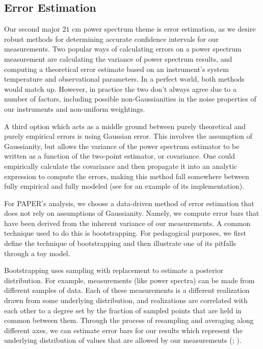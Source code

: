 \documentclass[preprint2,numberedappendix,tighten]{aastex6}  %
\begin{document}

\subsection{Error Estimation}
\label{sec:ErrorOverview}

Our second major $21$ cm power spectrum theme is error estimation, as we desire robust methods for determining accurate 
confidence intervals for our measurements. Two popular ways of calculating errors on a power spectrum 
measurement are calculating the variance of power spectrum results, and computing a theoretical error estimate based on an instrument's 
system temperature and observational parameters. In a perfect world, both methods would match up. However, in practice the 
two don't always agree due to a number of factors, including possible non-Gaussianities in the noise properties of our instruments and non-uniform 
weightings. 

A third option which acts as a middle ground between purely theoretical and purely empirical errors is using Gaussian error. This involves the assumption of Gaussianity, but allows the variance of the power spectrum estimator to be written as a function of the two-point estimator, or covariance. One could empirically calculate the covariance and then propagate it into an analytic expression to compute the errors, making this method fall somewhere between fully empirical and fully modeled (see \citet{das_et_al2011a} for an example of its implementation). 

For PAPER's analysis, we choose a data-driven method of error estimation that does not rely on assumptions of Gaussianity. Namely, we compute error bars that have been derived from the inherent 
variance of our measurements. A common technique used to do this is bootstrapping. For pedagogical purposes, we first define the technique of 
bootstrapping and then illustrate one of its pitfalls through a toy model.

Bootstrapping uses sampling with replacement to estimate a posterior distribution. For example, measurements (like power 
spectra) can be made from different samples of data. Each of these measurements is a different realization drawn from some underlying distribution, and realizations are correlated with each other to a degree set by the fraction of sampled points that are held in common 
between them. Through the process of resampling and averaging along different axes, we can estimate error bars for 
our results which represent the underlying distribution of values that are allowed by our measurements (\citealt{efron_tibshirani1994}; \citealt{andrae2010}).
\end{document}
